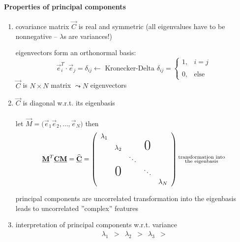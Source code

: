 \paragraph{Properties of principal components}
\begin{enumerate}[(1)]
\item covariance matrix $\vec{C}$ is real and symmetric (all eigenvalues have to be nonnegative -- $\lambda$s are variances!)
\begin{itemize}
	\itr eigenvectors form an orthonormal basis:
		\begin{equation}
			\vec{e}_i^T \cdot \vec{e}_j = \delta_{ij} 
			\leftarrow \text{ Kronecker-Delta }
			\delta_{ij} = \left\{ \begin{array}{ll}
				1, & i=j \\\\
				0, & \text{else}
			\end{array} \right.
		\end{equation}
	\itr $\vec{C}$ is $N \times N$ matrix $\leadsto N$ eigenvectors
\end{itemize}
\item $\vec{C}$ is diagonal w.r.t. its eigenbasis 
\\\\
\indent let $\vec{M} = \big( \vec{e}_1 \vec{e}_2, \ldots, \vec{e}_N \big)$ then
\begin{equation}
	\vec{M}^T \vec{C} \vec{M} = \widehat{\vec{C}} = 
	\left( \begin{array}{ccccc}
		\lambda_1 \\
		& \lambda_2 & & \text{{\huge{0}}} \\
		& & \ddots \\
		& \text{{\huge{0}}} & & \ddots \\
		& & & & \lambda_N
	\end{array} \right)
	\substack{	\text{transformation into} \\
			\text{the eigenbasis} }
\end{equation}
\begin{itemize}
	\itr principal components are uncorrelated
	\itr transformation into the eigenbasis leads to uncorrelated 
		''complex'' features
\end{itemize}
\item interpretation of principal components w.r.t. variance 
\begin{equation}
	\begin{array}{ccccccccccc}
		\lambda_1 & > & \lambda_2 & > & \lambda_3 & > 

\end{array}
\end{equation}
\end{enumerate}
